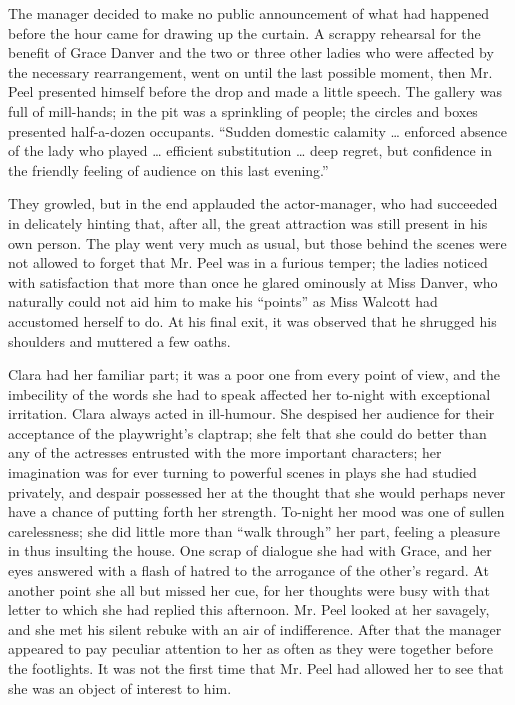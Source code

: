 The manager decided to make no public announcement of what had happened
before the hour came for drawing up the curtain. {}A scrappy rehearsal
for the benefit of Grace Danver and the two or three other ladies who
were affected by the necessary rearrangement, went on until the last
possible moment, then Mr. Peel presented himself before the drop and
made a little speech. The gallery was full of mill-hands; in the pit was
a sprinkling of people; the circles and boxes presented half-a-dozen
occupants. ``Sudden domestic calamity \ldots{} enforced absence of the
lady who played \ldots{} efficient substitution \ldots{} deep regret,
but confidence in the friendly feeling of audience on this last
evening.''

They growled, but in the end applauded the actor-manager, who had
succeeded in delicately hinting that, after all, the great attraction
was still present in his own person. The play went very much as usual,
but those behind the scenes were not allowed to forget that Mr. Peel was
in a furious temper; the ladies noticed with satisfaction that more than
once he glared ominously at Miss Danver, who naturally could not aid him
to make his ``points'' as Miss Walcott had accustomed {}herself to do.
At his final exit, it was observed that he shrugged his shoulders and
muttered a few oaths.

Clara had her familiar part; it was a poor one from every point of view,
and the imbecility of the words she had to speak affected her to-night
with exceptional irritation. Clara always acted in ill-humour. She
despised her audience for their acceptance of the playwright's claptrap;
she felt that she could do better than any of the actresses entrusted
with the more important characters; her imagination was for ever turning
to powerful scenes in plays she had studied privately, and despair
possessed her at the thought that she would perhaps never have a chance
of putting forth her strength. To-night her mood was one of sullen
carelessness; she did little more than ``walk through'' her part,
feeling a pleasure in thus insulting the house. One scrap of dialogue
she had with Grace, and her eyes answered with a flash of hatred to the
arrogance of the other's regard. At another point she all but missed her
cue, for her thoughts {}were busy with that letter to which she had
replied this afternoon. Mr. Peel looked at her savagely, and she met his
silent rebuke with an air of indifference. After that the manager
appeared to pay peculiar attention to her as often as they were together
before the footlights. It was not the first time that Mr. Peel had
allowed her to see that she was an object of interest to him.


